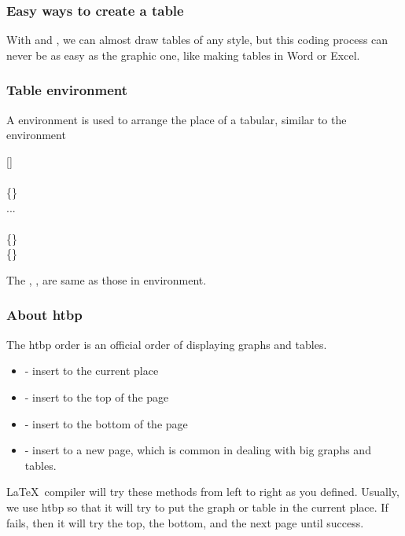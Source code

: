 \begin{frame}
	\frametitle{Easy ways to create a table}
	With  and , we can almost draw tables of any style, but this coding process can never be as easy as the graphic one, like making tables in Word or Excel.\\
	
\end{frame}

\begin{frame}
	\frametitle{Table environment}
    A  environment is used to arrange the place of a tabular, similar to the  environment
    \begin{command}
    	[]\\
    	\qquad {}\\
    	\qquad {}\{\}\\
    	\qquad \qquad ...\\
    	\qquad {}\\
    	\qquad {}\{\}\\
    	\qquad {}\{\}\\
	\end{command}
	The , ,  are same as those in  environment. 
\end{frame}

\begin{frame}
	\frametitle{About htbp}
	The htbp order is an official order of displaying graphs and tables.
	\begin{itemize}
		\item {} - insert to the current place
		\item {} - insert to the top of the page
		\item {} - insert to the bottom of the page
		\item {} - insert to a new page, which is common in dealing with big graphs and tables.
	\end{itemize}
	\LaTeX\ compiler will try these methods from left to right as you defined. Usually, we use htbp so that it will try to put the graph or table in the current place. If fails, then it will try the top, the bottom, and the next page until success.
\end{frame}

